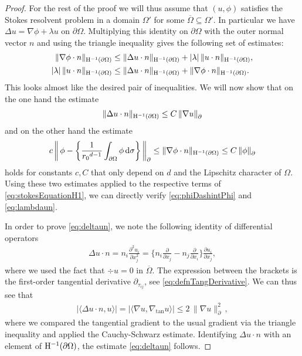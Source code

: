 \begin{proof}
  For the rest of the proof we will thus assume that $(u,\phi)$ satisfies the Stokes resolvent problem in a domain $\Omega'$ for some $\overline \Omega \subseteq \Omega'$.
  In particular we have $\Delta u = \nabla \phi + \lambda u$  on $\partial\Omega$.
  Multiplying this identity  on $\partial\Omega$ with the outer normal vector $n$ and using the triangle inequality gives the following set of estimates:
  \begin{align}
    \label{eq:stokesEquationH1}
    \begin{alignedat}{1}
    \|\nabla \phi \cdot n\|_{\mathrm{H}^{-1}(\partial\Omega)} 
    &\leq \|\Delta u \cdot n \|_{\mathrm{H}^{-1}(\partial\Omega)} + |\lambda|\, \| u\cdot n\|_{\mathrm{H}^{-1}(\partial\Omega)}, \\
    |\lambda|\, \| u\cdot n \|_{\mathrm{H}^{-1}(\partial\Omega)} 
    &\leq \|\Delta u \cdot n \|_{\mathrm{H}^{-1}(\partial\Omega)} + \|\nabla \phi \cdot n \|_{\mathrm{H}^{-1}(\partial\Omega)}.
    \end{alignedat}
  \end{align}
  This looks almost like the desired pair of inequalities.
  We will now show that on the one hand the estimate
  \begin{align}
    \label{eq:deltaun}
    \|\Delta u \cdot n\|_{\mathrm{H}^{-1}(\partial\Omega)}
    \leq C\, \|\nabla u\|^{}_\partial
  \end{align}
  and on the other hand the estimate
  \begin{align}
    \label{eq:nablaPhin}
    c \, \bigg\|\,\phi - \bigg\{ \frac{1}{{r_0}^{d - 1}}\int_{\partial\Omega} \phi \, {\operatorname{d}\!{\sigma}} \bigg\} \, \bigg\|^{}_\partial 
    \leq \|\nabla \phi \cdot n\|_{\mathrm{H}^{-1}(\partial\Omega)}
    \leq C\,  \|\phi\|^{}_\partial
  \end{align}
  holds for constants $c, C$ that only depend on $d$ and the Lipschitz character of $\Omega$.
  Using these two estimates applied to the respective terms of \eqref{eq:stokesEquationH1}, we can directly verify \eqref{eq:phiDashintPhi} and \eqref{eq:lambdaun}.

  In order to prove \eqref{eq:deltaun}, we note the following identity of differential operators
  \begin{align*}
    \Delta u \cdot n = n_i \frac{\partial^2 u_i}{\partial x_j^2} = \Big\{ n_i \frac{\partial}{\partial x_j} - n_j \frac{\partial}{\partial x_i} \Big\} \frac{\partial u_i}{\partial x_j},
  \end{align*}
  where we used the fact that $\div u = 0$ in $\overline \Omega$.
  The expression between the brackets is the first-order tangential derivative $\partial_{\tau_{ij}}$, see \eqref{eq:defnTangDerivative}. 
  We can thus see that
  \begin{align*}
    \big| \langle \Delta u \cdot n, u \rangle \big| = \big| \langle \nabla u, \nabla_{\mathrm{tan}} u \rangle\big| \leq 2\, \|\nabla u\|_\partial^2\,,
  \end{align*}
  where we compared the tangential gradient to the usual gradient via the triangle inequality and applied the Cauchy-Schwarz estimate.  
  Identifying $\Delta u \cdot n$ with an element of $\mathrm{H}^{-1}(\partial\Omega)$, the estimate \eqref{eq:deltaun} follows. 


\end{proof}
